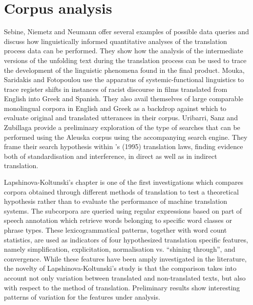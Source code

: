 \documentclass[output=paper]{LSP/langsci}
\begin{document}
\section{Corpus analysis}
Sebine, Niemetz and Neumann offer several examples of possible data queries and discuss how linguistically informed quantitative analyses of the translation process data can be performed. They show how the analysis of the intermediate versions of the unfolding text during the translation process can be used to trace the development of the linguistic phenomena found in the final product. Mouka, Saridakis and Fotopoulou use the apparatus of systemic-functional linguistics to trace register shifts in instances of racist discourse in films translated from English into Greek and Spanish. They also avail themselves of large comparable monolingual corpora in English and Greek as a backdrop against which to evaluate original and translated utterances in their corpus. Uribarri, Sanz and Zubillaga provide a preliminary exploration of the type of searches that can be performed using the Aleuska corpus using the accompanying search engine. They frame their search hypothesis within \citeauthor{Toury1995}'s (1995) translation laws, finding evidence both of standardisation and interference, in direct as well as in indirect translation. 

Lapshinova-Koltunski’s chapter is one of the first investigations which compares corpora obtained through different methods of translation to test a theoretical hypothesis rather than to evaluate the performance of machine translation systems. The subcorpora are queried using regular expressions based on part of speech annotation which retrieve words belonging to specific word classes or phrase types. These lexicogrammatical patterns, together with word count statistics, are used as indicators of four hypothesized translation specific features, namely simplification, explicitation, normalisation vs. “shining through”, and convergence. While these features have been amply investigated in the literature, the novelty of Lapshinova-Koltunski’s study is that the comparison takes into account not only variation between translated and non-translated texts, but also with respect to the method of translation. Preliminary results show interesting patterns of variation for the features under analysis.
\end{document}
